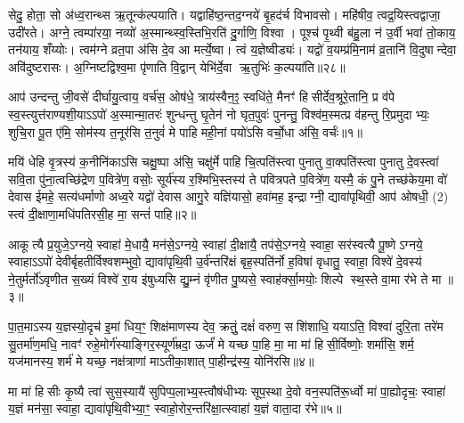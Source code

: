 सेदु॒ होता॒ सो अ॑ध्व॒रान्थ्स ऋ॒तून्क॑ल्पयाति। यद्वाहि॑ष्ठ॒न्तद॒ग्नये॑ बृ॒हद॑र्च विभावसो। महि॑षीव॒ त्वद्र॒यिस्त्वद्वाजा॒ उदी॑रते। अग्ने॒ त्वम्पा॑रया॒ नव्यो॑ अ॒स्मान्थ्स्व॒स्तिभि॒रति॑ दु॒र्गाणि॒ विश्वा। पूश्च॑ पृ॒थ्वी ब॑हु॒ला न॑ उ॒र्वी भवा॑ तो॒काय॒ तन॑याय॒ शँय्योः। त्वम॑ग्ने व्रत॒पा अ॑सि दे॒व आ मर्त्ये॒ष्वा। त्वं य॒ज्ञेष्वीड्यः॑। यद्वो॑ व॒यम्प्र॑मि॒नाम॑ व्र॒तानि॑ वि॒दुषान्देवा॒ अवि॑दुष्टरासः। अ॒ग्निष्टद्विश्व॒मा पृ॑णाति वि॒द्वान् येभि॑र्दे॒वा ऋ॒तुभिः॑ क॒ल्पया॑ति॥२८॥

{\anuvakamend[{जु॒षेथा॒मा स नो॑ यजा॒दा त्रयो॑विशतिश्च। (14)}]}

\setcounter{anuvakam}{0}
आप॑ उन्दन्तु जी॒वसे॑ दीर्घायु॒त्वाय॒ वर्च॑स॒ ओष॑धे॒ त्राय॑स्वैन॒ꣵ॒ स्वधि॑ते॒ मैनꣳ॑ हिसीर्देव॒श्रूरे॒तानि॒ प्र व॑पे स्व॒स्त्युत्त॑राण्यशी॒याऽऽपो॑ अ॒स्मान्मा॒तरः॑ शुन्धन्तु घृ॒तेन॑ नो घृत॒पुवः॑ पुनन्तु॒ विश्व॑म॒स्मत्प्र व॑हन्तु रि॒प्रमुदाभ्यः॒ शुचि॒रा पू॒त ए॑मि॒ सोम॑स्य त॒नूर॑सि त॒नुवं॑ मे पाहि मही॒नां पयो॑ऽसि वर्चो॒धा अ॑सि॒ वर्चः॑॥१॥

मयि॑ धेहि वृ॒त्रस्य॑ क॒नीनि॑काऽसि चक्षु॒ष्पा अ॑सि॒ चक्षु॑र्मे पाहि चि॒त्पति॑स्त्वा पुनातु वा॒क्पति॑स्त्वा पुनातु दे॒वस्त्वा॑ सवि॒ता पु॑ना॒त्वच्छि॑द्रेण प॒वित्रे॑ण॒ वसोः॒ सूर्य॑स्य र॒श्मिभि॒स्तस्य॑ ते पवित्रपते प॒वित्रे॑ण॒ यस्मै॒ कं पु॒ने तच्छ॑केय॒मा वो॑ देवास ईमहे॒ सत्य॑धर्माणो अध्व॒रे यद्वो॑ देवास आगु॒रे यज्ञि॑यासो॒ हवा॑मह॒ इन्द्राग्नी॒ द्यावा॑पृथिवी॒ आप॑ ओषधी॒ (2) स्त्वं दी॒क्षाणा॒मधि॑पतिरसी॒ह मा॒ सन्तं॑ पाहि॥२॥

{\anuvakamend[{वर्च॑ ओषधीर॒ष्टौ च॑॥१॥}]}

आकूत्यै प्र॒युजे॒ऽग्नये॒ स्वाहा॑ मे॒धायै॒ मन॑से॒ऽग्नये॒ स्वाहा॑ दी॒क्षायै॒ तप॑से॒ऽग्नये॒ स्वाहा॒ सर॑स्वत्यै पू॒ष्णेऽग्नये॒ स्वाहाऽऽपो॑ देवीर्बृहतीर्विश्वशम्भुवो॒ द्यावा॑पृथि॒वी उ॒र्व॑न्तरि॑क्षं बृह॒स्पति॑र्नो ह॒विषा॑ वृधातु॒ स्वाहा॒ विश्वे॑ दे॒वस्य॑ ने॒तुर्मर्तो॑ऽवृणीत स॒ख्यं विश्वे॑ रा॒य इ॑षुध्यसि द्यु॒म्नं वृ॑णीत पु॒ष्यसे॒ स्वाह॑र्क्सा॒मयोः॒ शिल्पे स्थ॒स्ते वा॒मा र॑भे ते मा॥३॥

पा॒त॒माऽस्य य॒ज्ञस्यो॒दृच॑ इ॒मां धिय॒ꣳ॒ शिक्ष॑माणस्य देव॒ क्रतुं॒ दक्षं॑ वरुण॒ सशि॑शाधि॒ ययाऽति॒ विश्वा॑ दुरि॒ता तरे॑म सु॒तर्मा॑ण॒मधि॒ नावꣳ॑ रुहे॒मोर्ग॑स्याङ्गिर॒स्यूर्ण॑म्रदा॒ ऊर्जं॑ मे यच्छ पा॒हि मा॒ मा मा॑ हिसी॒र्विष्णोः॒ शर्मा॑सि॒ शर्म॒ यज॑मानस्य॒ शर्म॑ मे यच्छ॒ नक्ष॑त्राणां माऽतीका॒शात् पा॒हीन्द्र॑स्य॒ योनि॑रसि॥४॥

मा मा॑ हिसीः कृ॒ष्यै त्वा॑ सुस॒स्यायै॑ सुपिप्प॒लाभ्य॒स्त्वौष॑धीभ्यः सूप॒स्था दे॒वो वन॒स्पति॑रू॒र्ध्वो मा॑ पा॒ह्योदृचः॒ स्वाहा॑ य॒ज्ञं मन॑सा॒ स्वाहा॒ द्यावा॑पृथि॒वीभ्या॒ꣳ॒ स्वाहो॒रोर॒न्तरि॑क्षा॒त्स्वाहा॑ य॒ज्ञं वाता॒दा र॑भे॥५॥

